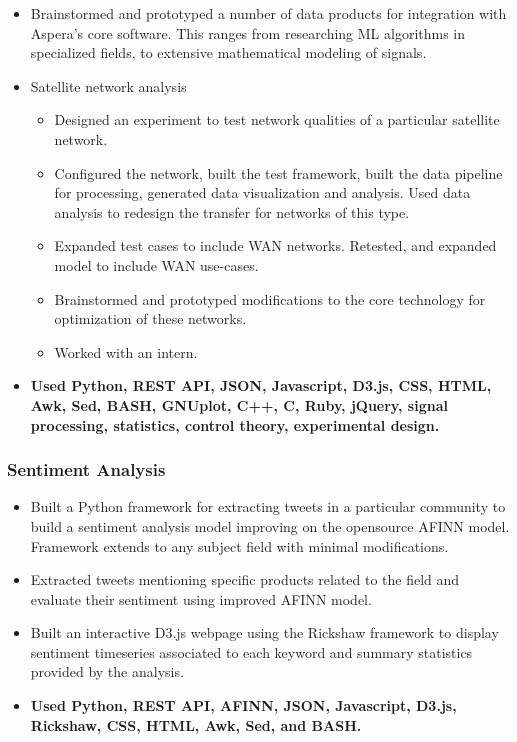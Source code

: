 \documentclass[a4paper,10pt,notitlepage]{article}
\begin{document}
\begin{itemize}
\begin{itemize}
					\end{itemize}
	\vspace{-5pt}\item 	Brainstormed and prototyped a number of data products for integration with Aspera's core software. This ranges from researching ML algorithms in specialized fields, to extensive mathematical modeling of signals. 
	\vspace{-5pt}\item 	Satellite network analysis \begin{itemize}
					\item 	Designed an experiment to test network qualities of a particular satellite network. 
					\item 	Configured the network, built the test framework, built the data pipeline for processing, generated data visualization and analysis. Used data analysis to redesign the transfer for networks of this type. 
					\item 	Expanded test cases to include WAN networks. Retested, and expanded model to include WAN use-cases. 
					\item 	Brainstormed and prototyped modifications to the core technology for optimization of these networks. 						\item 	Worked with an intern.
					\end{itemize}
	 \vspace{-5pt}\item 	\textbf{Used Python, REST API, JSON, Javascript, D3.js, CSS, HTML, Awk, Sed, BASH, GNUplot, C++, C, Ruby, jQuery, signal processing, statistics, control theory, experimental design.}
	\end{itemize}

\subsubsection*{Sentiment Analysis}
	\begin{itemize}
	\vspace{-5pt}\item 	Built a Python framework for extracting tweets in a particular community to build a sentiment analysis model improving on the opensource AFINN model. Framework extends to any subject field with minimal modifications.
	\vspace{-5pt}\item 	Extracted tweets mentioning specific products related to the field and evaluate their sentiment using improved AFINN model.
	\vspace{-5pt}\item 	Built an interactive D3.js webpage using the Rickshaw framework to display sentiment timeseries associated to each keyword and summary statistics provided by the analysis.
	 \vspace{-5pt}\item 	\textbf{Used Python, REST API, AFINN, JSON, Javascript, D3.js, Rickshaw, CSS, HTML, Awk, Sed, and BASH.}
	\end{itemize}
\end{document}
